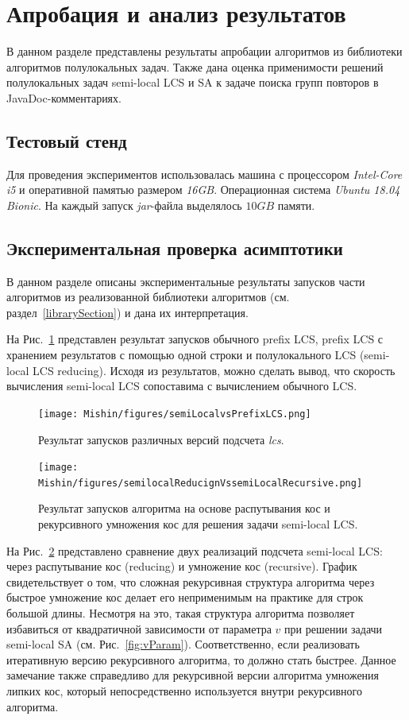 \section{Апробация и анализ результатов}\label{appob}
В данном разделе представлены результаты апробации алгоритмов из библиотеки алгоритмов полулокальных задач.
Также дана оценка применимости решений полулокальных задач {semi-local LCS и SA} к задаче поиска групп повторов в JavaDoc-комментариях.


\subsection{Тестовый стенд}

Для проведения экспериментов использовалась
машина с процессором \emph{Intel-Core i5} и оперативной памятью размером \emph{16GB}.
Операционная система \emph{Ubuntu 18.04 Bionic}.
На каждый запуск \emph{jar}-файла выделялось $10GB$ памяти.

\subsection{Экспериментальная проверка асимптотики}

В данном разделе описаны экспериментальные результаты запусков части алгоритмов из реализованной библиотеки алгоритмов (см. раздел~\ref{librarySection})  и дана их интерпретация.

На Рис.~\ref{fig:speedLCS} представлен результат запусков
обычного {prefix LCS}, {prefix LCS} с хранением результатов с помощью одной строки и полулокального {LCS} ({semi-local LCS reducing}).
Исходя из результатов, можно сделать вывод, что скорость вычисления {semi-local LCS} сопоставима с вычислением обычного {LCS}.

\begin{figure}[t!]
\centering
    \texttt{[image: Mishin/figures/semiLocalvsPrefixLCS.png]}
    \caption{Результат запусков различных версий подсчета \emph{lcs}.}\label{fig:speedLCS}
\end{figure}

\begin{figure}[t!]
\centering
    \texttt{[image: Mishin/figures/semilocalReducignVssemiLocalRecursive.png]}
    \caption{Результат запусков алгоритма на основе распутывания кос и рекурсивного умножения кос для решения задачи {semi-local LCS}.}\label{fig:speedLCS2}
\end{figure}

На Рис.~\ref{fig:speedLCS2} представлено сравнение двух реализаций подсчета {semi-local LCS}: через распутывание кос ({reducing}) и  умножение кос ({recursive}).
График свидетельствует о том, что сложная  рекурсивная структура алгоритма через быстрое умножение кос делает его неприменимым на практике  для строк  большой длины. Несмотря на это, такая структура алгоритма позволяет избавиться от квадратичной зависимости от параметра $v$ при решении задачи {semi-local SA} (см. Рис.~\ref{fig:vParam}).
Соответственно, если реализовать итеративную версию рекурсивного алгоритма, то должно стать быстрее.
Данное замечание также справедливо для рекурсивной версии алгоритма умножения липких кос, который непосредственно используется внутри рекурсивного алгоритма.

